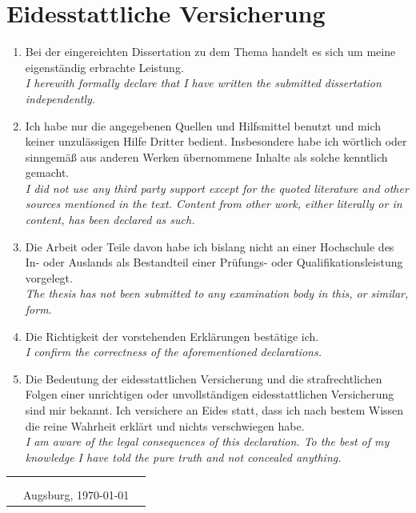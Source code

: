 \chapter*{Eidesstattliche Versicherung}
    
    \begin{enumerate}
        \setlength{\itemsep}{0pt}
        \item Bei der eingereichten Dissertation zu dem Thema \emph{\textbf{\thesistitle}} handelt es sich um meine eigenständig erbrachte Leistung.\\
        \emph{\small\color{dkfzgray2} I herewith formally declare that I have written the submitted dissertation \textbf{\thesistitle} independently.}
        
        \item Ich habe nur die angegebenen Quellen und Hilfsmittel benutzt und mich keiner unzulässigen Hilfe Dritter bedient. Insbesondere habe ich wörtlich oder sinngemäß aus anderen Werken übernommene Inhalte als solche kenntlich gemacht.\\
        \emph{\small\color{dkfzgray2}  I did not use any third party support except for the quoted literature and other sources mentioned in the text. Content from other work, either literally or in content, has been declared as such.}
        
        \item Die Arbeit oder Teile davon habe ich bislang nicht an einer Hochschule des In- oder Auslands als Bestandteil einer Prüfungs- oder Qualifikationsleistung vorgelegt.\\
        \emph{\small\color{dkfzgray2} The thesis has not been submitted to any examination body in this, or similar, form. }
        
        \item Die Richtigkeit der vorstehenden Erklärungen bestätige ich.\\
        \emph{\small\color{dkfzgray2} I confirm the correctness of the aforementioned declarations.}
        
        \item Die Bedeutung der eidesstattlichen Versicherung und die strafrechtlichen Folgen einer unrichtigen oder unvollständigen eidesstattlichen Versicherung sind mir bekannt. Ich versichere an Eides statt, dass ich nach bestem Wissen die reine Wahrheit erklärt und nichts verschwiegen habe.\\
        \emph{\small\color{dkfzgray2} I am aware of the legal consequences of this declaration. To the best of my knowledge I have told the pure truth and not concealed anything.}
    \end{enumerate}
    
    \begin{tabular}{p{3cm}p{5cm}p{4cm}}
          &  & \\
          & & \\
          &Augsburg, \today & \hrulefill\\
    \end{tabular}